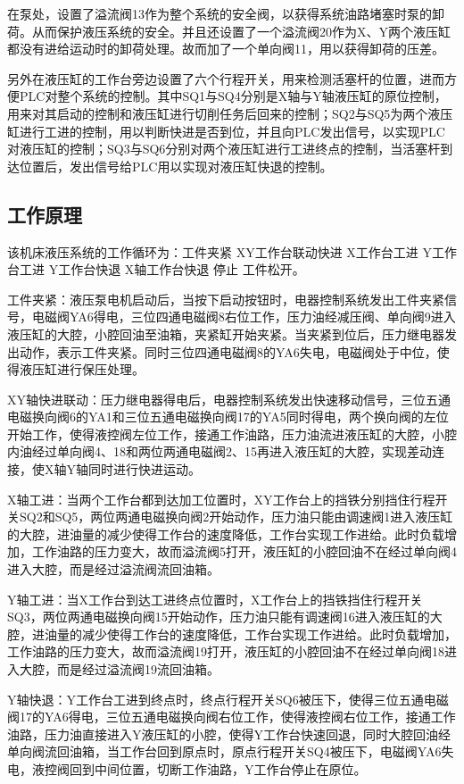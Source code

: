 在泵处，设置了溢流阀13作为整个系统的安全阀，以获得系统油路堵塞时泵的卸荷。从而保护液压系统的安全。并且还设置了一个溢流阀20作为X、Y两个液压缸都没有进给运动时的卸荷处理。故而加了一个单向阀11，用以获得卸荷的压差。

另外在液压缸的工作台旁边设置了六个行程开关，用来检测活塞杆的位置，进而方便PLC对整个系统的控制。其中SQ1与SQ4分别是X轴与Y轴液压缸的原位控制，用来对其启动的控制和液压缸进行切削任务后回来的控制；SQ2与SQ5为两个液压缸进行工进的控制，用以判断快进是否到位，并且向PLC发出信号，以实现PLC对液压缸的控制；SQ3与SQ6分别对两个液压缸进行工进终点的控制，当活塞杆到达位置后，发出信号给PLC用以实现对液压缸快退的控制。

\newpage
\subsection{工作原理}
该机床液压系统的工作循环为：工件夹紧  XY工作台联动快进  X工作台工进  Y工作台工进  Y工作台快退  X轴工作台快退  停止  工件松开。
	
工件夹紧：液压泵电机启动后，当按下启动按钮时，电器控制系统发出工件夹紧信号，电磁阀YA6得电，三位四通电磁阀8右位工作，压力油经减压阀、单向阀9进入液压缸的大腔，小腔回油至油箱，夹紧缸开始夹紧。当夹紧到位后，压力继电器发出动作，表示工件夹紧。同时三位四通电磁阀8的YA6失电，电磁阀处于中位，使得液压缸进行保压处理。
	
XY轴快进联动：压力继电器得电后，电器控制系统发出快速移动信号，三位五通电磁换向阀6的YA1和三位五通电磁换向阀17的YA5同时得电，两个换向阀的左位开始工作，使得液控阀左位工作，接通工作油路，压力油流进液压缸的大腔，小腔内油经过单向阀4、18和两位两通电磁阀2、15再进入液压缸的大腔，实现差动连接，使X轴Y轴同时进行快进运动。
	
X轴工进：当两个工作台都到达加工位置时，XY工作台上的挡铁分别挡住行程开关SQ2和SQ5，两位两通电磁换向阀2开始动作，压力油只能由调速阀1进入液压缸的大腔，进油量的减少使得工作台的速度降低，工作台实现工作进给。此时负载增加，工作油路的压力变大，故而溢流阀5打开，液压缸的小腔回油不在经过单向阀4进入大腔，而是经过溢流阀流回油箱。
	
Y轴工进：当X工作台到达工进终点位置时，X工作台上的挡铁挡住行程开关SQ3，两位两通电磁换向阀15开始动作，压力油只能有调速阀16进入液压缸的大腔，进油量的减少使得工作台的速度降低，工作台实现工作进给。此时负载增加，工作油路的压力变大，故而溢流阀19打开，液压缸的小腔回油不在经过单向阀18进入大腔，而是经过溢流阀19流回油箱。
	
Y轴快退：Y工作台工进到终点时，终点行程开关SQ6被压下，使得三位五通电磁阀17的YA6得电，三位五通电磁换向阀右位工作，使得液控阀右位工作，接通工作油路，压力油直接进入Y液压缸的小腔，使得Y工作台快速回退，同时大腔回油经单向阀流回油箱，当工作台回到原点时，原点行程开关SQ4被压下，电磁阀YA6失电，液控阀回到中间位置，切断工作油路，Y工作台停止在原位。
	
